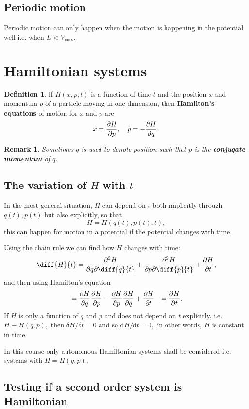 \documentclass[12pt, a4paper]{article}
\newtheorem*{remark}{Remark}
\theoremstyle{definition}
\newtheorem{definition}{Definition}[section]
\theoremstyle{plain}
\begin{document}
\subsection{Periodic motion}

Periodic motion can only happen when the motion is happening in the potential well i.e. when $E<V_\text{max}.$

\section{Hamiltonian systems}

\begin{definition}
If $H(x,p,t)$ is a function of time $t$ and the position $x$ and momentum $p$ of a particle moving in one dimension, then \textbf{Hamilton’s equations} of motion for $x$ and $p$ are $$\dot{x}=\pdv{H}{p}, \quad \dot{p}=-\pdv{H}{q}.$$
\end{definition}

\begin{remark}
Sometimes $q$ is used to denote position such that $p$ is the \textbf{conjugate momentum} of $q.$
\end{remark}

\subsection{The variation of \texorpdfstring{$H$}{TEXT} with \texorpdfstring{$t$}{TEXT}}

In the most general situation, $H$ can depend on $t$ both implicitly through $q(t), p(t)$ but also
explicitly, so that $$H=H(q(t),p(t),t),$$ this can happen for motion in a potential if the potential changes with time.

Using the chain rule we can find how $H$ changes with time: $$\diff{H}{t}=\pdv{H}{q}\diff{q}{t}+\pdv{H}{p}\diff{p}{t}+\pdv{H}{t},$$ and then using Hamilton's equation $$\begin{aligned}
&=\pdv{H}{q}\pdv{H}{p}-\pdv{H}{p}\pdv{H}{q}+\pdv{H}{t}
&=\pdv{H}{t}.
\end{aligned}$$ If $H$ is only a function of $q$ and $p$ and does not depend on $t$ explicitly, i.e. $H \equiv H(q,p),$ then $\delta H/\delta t = 0 $ and so $\text{d}H/\text{d}t= 0,$ in other words, $H$ is constant in time.

In this course only autonomous Hamiltonian systems shall be considered i.e. systems with $H=H(q,p).$

\subsection{Testing if a second order system is Hamiltonian}
\end{document}
